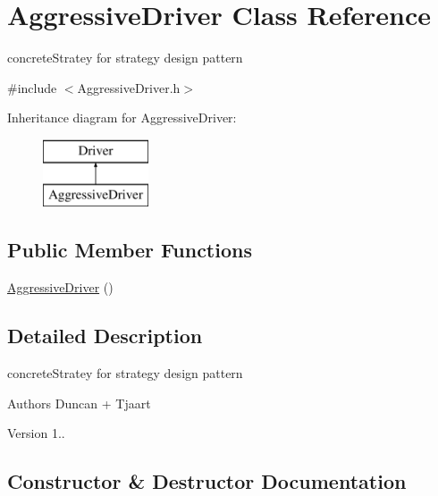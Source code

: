 \hypertarget{class_aggressive_driver}{}\section{Aggressive\+Driver Class Reference}
\label{class_aggressive_driver}


concrete\+Stratey for strategy design pattern  




{\ttfamily \#include $<$Aggressive\+Driver.\+h$>$}

Inheritance diagram for Aggressive\+Driver\+:\begin{figure}[H]
\begin{center}
\leavevmode
\includegraphics[height=2.000000cm]{class_aggressive_driver}
\end{center}
\end{figure}
\subsection*{Public Member Functions}
\begin{DoxyCompactItemize}
\item 
\mbox{\hyperlink{class_aggressive_driver_a3cacd236466bbbd9e156ab5a0d7dfdf3}{Aggressive\+Driver}} ()
\end{DoxyCompactItemize}


\subsection{Detailed Description}
concrete\+Stratey for strategy design pattern 

\begin{DoxyAuthor}{Authors}
Duncan + Tjaart 
\end{DoxyAuthor}
\begin{DoxyVersion}{Version}
1.. 
\end{DoxyVersion}


\subsection{Constructor \& Destructor Documentation}
\mbox{\label{class_aggressive_driver_a3cacd236466bbbd9e156ab5a0d7dfdf3}} 
